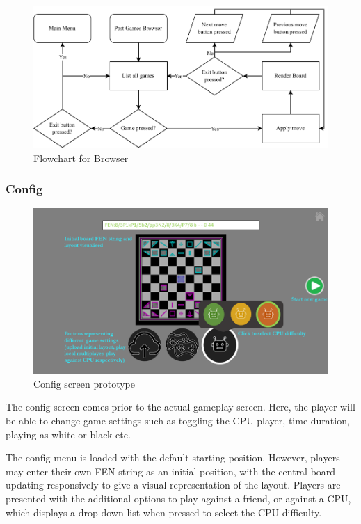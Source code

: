 \documentclass[../main/main.tex]{subfiles}
\begin{document}
\begin{figure}[H]
    \centering
    \includegraphics[width=\columnwidth]{../design/assets/browser_flowchart.pdf}
    \caption{Flowchart for Browser}
    \label{fig:browser-flowchart}
\end{figure}

\subsubsection{Config}
\begin{figure}[H]
    \centering
    \includegraphics[width=0.8\columnwidth]{../design/assets/config_gui.png}
    \caption{Config screen prototype}
    \label{fig:config-gui}
\end{figure}

The config screen comes prior to the actual gameplay screen. Here, the player will be able to change game settings such as toggling the CPU player, time duration, playing as white or black etc.

The config menu is loaded with the default starting position. However, players may enter their own FEN string as an initial position, with the central board updating responsively to give a visual representation of the layout. Players are presented with the additional options to play against a friend, or against a CPU, which displays a drop-down list when pressed to select the CPU difficulty.
\end{document}
